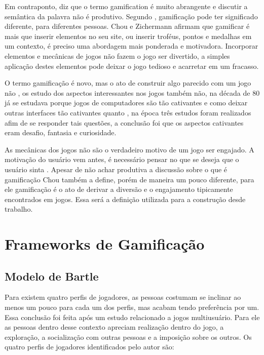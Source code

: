 \newpage


 Em contraponto, \cite{chou2015actionable} diz que o termo gamification é muito abrangente e discutir a semântica da palavra não é produtivo.  Segundo \cite{zichermann2011gamification}, gamificação pode ter significado diferente, para diferentes pessoas. Chou e Zichermann afirmam que gamificar é mais que inserir elementos no seu site, ou inserir troféus, pontos e medalhas em um contexto, é preciso uma abordagem mais ponderada e motivadora. Incorporar elementos e mecânicas de jogos não fazem o jogo ser divertido, a simples aplicação destes elementos pode deixar o jogo tedioso e acarretar em um fracasso.

 O termo gamificação é novo, mas o ato de construir algo parecido com um jogo não \cite{chou2015actionable}, os estudo dos aspectos interessantes nos jogos também não, na década de 80 já se estudava porque jogos de computadores são tão cativantes e como deixar outras interfaces tão cativantes quanto \cite{malone1982heuristics}, na época três estudos foram realizados afim de se responder tais questões, a conclusão foi que os aspectos cativantes eram desafio, fantasia e curiosidade. 

As mecânicas dos jogos não são o verdadeiro motivo de um jogo ser engajado. A motivação do usuário vem antes, é necessário pensar no que se deseja que o usuário sinta \cite{chou2015actionable}. Apesar de não achar produtiva a discussão sobre o que é gamificação Chou também a define, porém de maneira um pouco diferente, para ele gamificação é o ato de derivar a diversão e o engajamento tipicamente encontrados em jogos. Essa será a definição utilizada para a construção desde trabalho.


\section{Frameworks de Gamificação}

\subsection{Modelo de Bartle}

Para \cite{bartle1996hearts} existem quatro perfis de jogadores, as pessoas costumam se inclinar ao menos um pouco para cada um dos perfis, mas acabam tendo preferência por um. Essa conclusão foi feita após um estudo relacionado a jogos multiusuário. Para ele as pessoas dentro desse contexto apreciam realização dentro do jogo, a exploração, a socialização com outras pessoas e a imposição sobre os outros. Os quatro perfis de jogadores identificados pelo autor são:



